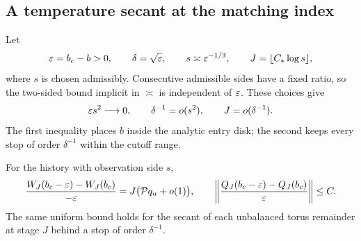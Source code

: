 \subsection{A temperature secant at the matching index}

Let
\[
 \varepsilon=b_c-b>0,\qquad \delta=\sqrt{\varepsilon},
 \qquad s\asymp\varepsilon^{-1/3},\qquad
 J=\lfloor C_*\log s\rfloor,
\]
where \(s\) is chosen admissibly.  Consecutive admissible sides have
a fixed ratio, so the two-sided bound implicit in \(\asymp\)
is independent of \(\varepsilon\).  These choices give
\begin{equation}\label{eq:traj-scale-slack}
 \varepsilon s^2\longrightarrow0,
 \qquad \delta^{-1}=o(s^2),
 \qquad J=o(\delta^{-1}).
\end{equation}
The first inequality places \(b\) inside the analytic entry disk;
the second keeps every stop of order \(\delta^{-1}\) within the
cutoff range.

\begin{lemma}\label{lem:traj-secant}
For the history with observation side \(s\),
\begin{equation}\label{eq:traj-secant-match}
 \frac{W_J(b_c-\varepsilon)-W_J(b_c)}{-\varepsilon}
      =J\bigl(\mathcal Pq_u+o(1)\bigr),
 \qquad
 \left\|\frac{Q_J(b_c-\varepsilon)-Q_J(b_c)}{\varepsilon}\right\|\le C.
\end{equation}
The same uniform bound holds for the secant of each unbalanced torus
remainder at stage \(J\) behind a stop of order \(\delta^{-1}\).
\end{lemma}

